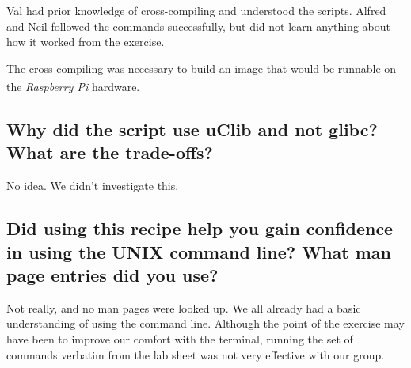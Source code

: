 \documentclass[11pt,a4paper,titlepage]{report}
\newcommand{\rpi}{\textit{Raspberry Pi\textsuperscript{\textregistered}}}
\begin{document}
\begin{appendices}
Val had prior knowledge of cross-compiling and understood the scripts. Alfred and Neil followed the commands successfully, but did not learn anything about how it worked from the exercise.

The cross-compiling was necessary to build an image that would be runnable on the \rpi\xspace hardware.

\subsection*{Why did the script use uClib and not glibc? What are the trade-offs?}

No idea. We didn't investigate this.

\subsection*{Did using this recipe help you gain confidence in using the UNIX command 
line? What man page entries did you use? }

Not really, and no man pages were looked up. We all already had a basic understanding of using the command line. Although the point of the exercise may have been to improve our comfort with the terminal, running the set of commands verbatim from the lab sheet was not very effective with our group.

\end{appendices}




\nocite{*}
\printbibliography[heading=bibintoc]
\end{document}
